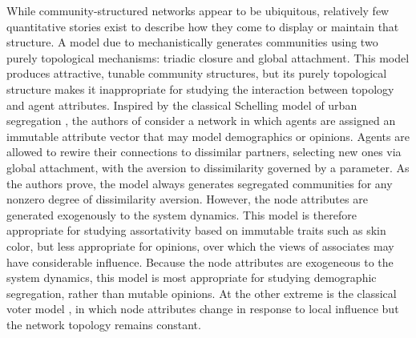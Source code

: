 \documentclass[review, onefignum, onetabnum]{siamart171218}
\begin{document}
	While community-structured networks appear to be ubiquitous, relatively few quantitative stories exist to describe how they come to display or maintain that structure. 
	A model due to \cite{Kumpula2007} mechanistically generates communities using two purely topological mechanisms: triadic closure and global attachment. 
	This model produces attractive, tunable community structures, but its purely topological structure makes it inappropriate for studying the interaction between topology and agent attributes. 
	Inspired by the classical Schelling model of urban segregation \cite{Schelling1979}, the authors of \cite{Henry2011} consider a network in which agents are assigned an immutable attribute vector that may model demographics or opinions. 
	Agents are allowed to rewire their connections to dissimilar partners, selecting new ones via global attachment, with the aversion to dissimilarity governed by a parameter. 
	As the authors prove, the model always generates segregated communities for any nonzero degree of dissimilarity aversion. 
	However, the node attributes are generated exogenously to the system dynamics.
	This model is therefore appropriate for studying assortativity based on immutable traits such as skin color, but less appropriate for opinions, over which the views of associates may have considerable influence.
	Because the node attributes are exogeneous to the system dynamics, this model is most appropriate for studying demographic segregation, rather than mutable opinions. 
	At the other extreme is the classical voter model \cite{Clifford1973,Holley1975}, in which node attributes change in response to local influence but the network topology remains constant.
\end{document}
